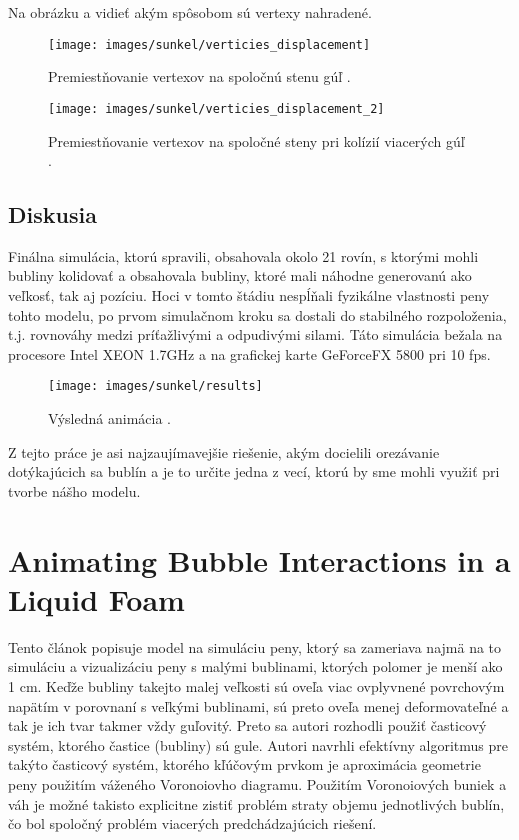 Na obrázku  a  vidieť akým spôsobom sú vertexy nahradené.
\begin{figure}[H]
	\begin{center}
		\texttt{[image: images/sunkel/verticies\_displacement]}
		\caption{Premiestňovanie vertexov na spoločnú stenu gúľ \cite{sunkel2004}.}
		\label{img:verticies_displacement}
	\end{center}
\end{figure}
\begin{figure}[H]
	\begin{center}
		\texttt{[image: images/sunkel/verticies\_displacement\_2]}
		\caption{Premiestňovanie vertexov na spoločné steny pri kolízií viacerých gúľ \cite{sunkel2004}.}
		\label{img:verticies_displacement_2}
	\end{center}
\end{figure}

\subsection{Diskusia}

Finálna simulácia, ktorú spravili, obsahovala okolo 21 rovín, s ktorými mohli bubliny kolidovať a obsahovala bubliny, ktoré mali náhodne generovanú ako veľkosť, tak aj pozíciu. Hoci v tomto štádiu nespĺňali fyzikálne vlastnosti peny tohto modelu, po prvom simulačnom kroku sa dostali do stabilného rozpoloženia, t.j. rovnováhy medzi príťažlivými a odpudivými silami. Táto simulácia bežala na procesore Intel XEON 1.7GHz a na grafickej karte GeForceFX 5800 pri 10 fps.
\begin{figure}[H]
	\begin{center}
		\texttt{[image: images/sunkel/results]}
		\caption{Výsledná animácia \cite{sunkel2004}.}
	\end{center}
\end{figure}

Z tejto práce je asi najzaujímavejšie riešenie, akým docielili orezávanie dotýkajúcich sa bublín a je to určite jedna z vecí, ktorú by sme mohli využiť pri tvorbe nášho modelu.

\section{Animating Bubble Interactions in a Liquid Foam \cite{busaryev2012}}

Tento článok popisuje model na simuláciu peny, ktorý sa zameriava najmä na to simuláciu a vizualizáciu peny s malými bublinami, ktorých polomer je menší ako 1 cm. Keďže bubliny takejto malej veľkosti sú oveľa viac ovplyvnené povrchovým napätím v porovnaní s veľkými bublinami, sú preto oveľa menej deformovateľné a tak je ich tvar takmer vždy guľovitý. Preto sa autori rozhodli použiť časticový systém, ktorého častice (bubliny) sú gule. Autori navrhli efektívny algoritmus pre takýto časticový systém, ktorého kľúčovým prvkom je aproximácia geometrie peny použitím váženého Voronoiovho diagramu. Použitím Voronoiových buniek a váh je možné takisto explicitne zistiť problém straty objemu jednotlivých bublín, čo bol spoločný problém viacerých predchádzajúcich riešení.

